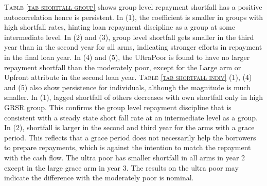\begin{palepinkleftbar}
\begin{finding}
\textsc{\small Table \ref{tab shortfall group}} shows group level repayment shortfall has a positive autocorrelation hence is persistent. In (1), the coefficient is smaller in groups with high shortfall rates, hinting loan repayment discipline as a group at some intermediate level. In (2) and (3), group level shortfall gets smaller in the third year than in the second year for all arms, indicating stronger efforts in repayment in the final loan year. In (4) and (5), the \textsf{UltraPoor} is found to have no larger repayment shortfall than the moderately poor, except for the \textsf{Large} arm or \textsf{Upfront} attribute in the second loan year. \textsc{\small Table \ref{tab shortfall indiv}} (1), (4) and (5) also show persistence for individuals, although the magnitude is much smaller. In (1), lagged shortfall of others decreases with own shortfall only in high GRSR group. This confirms the group level repayment discipline that is consistent with a steady state short fall rate at an intermediate level as a group.  In (2), shortfall is larger in the second and third year for the arms with a grace period. This reflects that a grace period does not necessarily help the borrowers to prepare repayments, which is against the intention to match the repayment with the cash flow. The ultra poor has smaller shortfall in all arms in year 2 except in the large grace arm in year 3. The results on the ultra poor may indicate the difference with the moderately poor is nominal.
\end{finding}
\end{palepinkleftbar}


